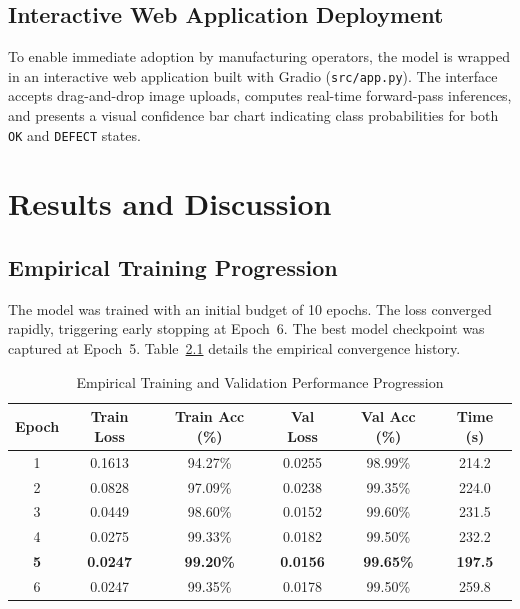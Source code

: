 \documentclass[12pt,a4paper]{report}
\begin{document}
\section{Interactive Web Application Deployment}
To enable immediate adoption by manufacturing operators, the model is wrapped in an interactive web application built with Gradio (\texttt{src/app.py}). The interface accepts drag-and-drop image uploads, computes real-time forward-pass inferences, and presents a visual confidence bar chart indicating class probabilities for both \texttt{OK} and \texttt{DEFECT} states.

\chapter{Results and Discussion}

\section{Empirical Training Progression}
The model was trained with an initial budget of 10 epochs. The loss converged rapidly, triggering early stopping at Epoch~6. The best model checkpoint was captured at Epoch~5. Table~\ref{tab:training_prog} details the empirical convergence history.

\begin{table}[h]
\centering
\caption{Empirical Training and Validation Performance Progression}
\label{tab:training_prog}
\begin{tabular}{cccccc}
\toprule
\textbf{Epoch} & \textbf{Train Loss} & \textbf{Train Acc (\%)} & \textbf{Val Loss} & \textbf{Val Acc (\%)} & \textbf{Time (s)} \\
\midrule
1 & 0.1613 & 94.27\% & 0.0255 & 98.99\% & 214.2 \\
2 & 0.0828 & 97.09\% & 0.0238 & 99.35\% & 224.0 \\
3 & 0.0449 & 98.60\% & 0.0152 & 99.60\% & 231.5 \\
4 & 0.0275 & 99.33\% & 0.0182 & 99.50\% & 232.2 \\
\textbf{5} & \textbf{0.0247} & \textbf{99.20\%} & \textbf{0.0156} & \textbf{99.65\%} & \textbf{197.5} \\
6 & 0.0247 & 99.35\% & 0.0178 & 99.50\% & 259.8 \\
\bottomrule
\end{tabular}
\end{table}
\end{document}
